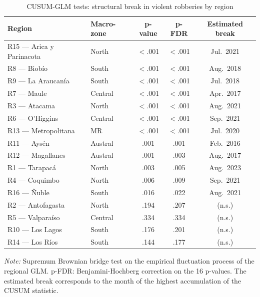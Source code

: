 \documentclass[pdflatex,sn-basic]{sn-jnl}
\newcommand{\tablenote}[1]{%
  \vspace{2pt}\par
  {\footnotesize\textit{Note:} #1\par}
}
\begin{document}
\begin{table}[htbp]
\centering
\caption{CUSUM-GLM tests: structural break in violent robberies by region}
\label{tab:cusum}
\footnotesize
\begin{tabular}{llccc}
\toprule
\textbf{Region} & \textbf{Macro-zone} & \textbf{p-value} & \textbf{p-FDR} & \textbf{Estimated break} \\
\midrule
R15 --- Arica y Parinacota & North   & $<$.001  & $<$.001 & Jul.\ 2021 \\
R8 --- Biob\'io            & South     & $<$.001  & $<$.001 & Aug.\ 2018 \\
R9 --- La Araucan\'ia      & South     & $<$.001  & $<$.001 & Jul.\ 2018 \\
R7 --- Maule               & Central  & $<$.001  & $<$.001 & Apr.\ 2017 \\
R3 --- Atacama             & North   & $<$.001  & $<$.001 & Aug.\ 2021 \\
R6 --- O'Higgins           & Central  & $<$.001  & $<$.001 & Sep.\ 2021 \\
R13 --- Metropolitana      & MR      & $<$.001  & $<$.001 & Jul.\ 2020 \\
R11 --- Ays\'en            & Austral & .001     & .001    & Feb.\ 2016 \\
R12 --- Magallanes         & Austral & .001     & .003    & Aug.\ 2017 \\
R1 --- Tarapac\'a          & North   & .003     & .005    & Aug.\ 2023 \\
R4 --- Coquimbo            & North   & .006     & .009    & Sep.\ 2021 \\
R16 --- \~Nuble            & South     & .016     & .022    & Aug.\ 2021 \\
\midrule
R2 --- Antofagasta         & North   & .194     & .207    & (n.s.) \\
R5 --- Valpara\'iso        & Central  & .334     & .334    & (n.s.) \\
R10 --- Los Lagos          & South     & .176     & .201    & (n.s.) \\
R14 --- Los R\'ios         & South     & .144     & .177    & (n.s.) \\
\bottomrule
\end{tabular}
\tablenote{Supremum Brownian bridge test on the empirical fluctuation process of the regional GLM.
p-FDR: Benjamini-Hochberg correction on the 16 p-values. The estimated break corresponds to the month of the highest accumulation of the CUSUM statistic.}
\end{table}
\end{document}
